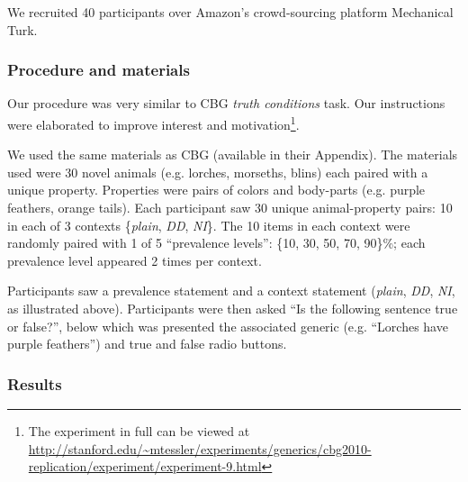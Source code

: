 \documentclass[10pt,letterpaper]{article}
\begin{document}
We recruited 40 participants over Amazon's crowd-sourcing platform Mechanical Turk.  

\subsubsection{Procedure and materials}

Our procedure was very similar to CBG \emph{truth conditions} task. Our instructions were elaborated to improve interest and motivation\footnote{The experiment in full can be viewed at \url{http://stanford.edu/~mtessler/experiments/generics/cbg2010-replication/experiment/experiment-9.html}}. 

We used the same materials as CBG (available in their Appendix). The materials used were 30 novel animals (e.g. lorches, morseths, blins) each paired with a unique property. Properties were pairs of colors and body-parts (e.g. purple feathers, orange tails). Each participant saw 30 unique animal-property pairs: 10 in each of 3 contexts \{\emph{plain}, \emph{DD}, \emph{NI}\}. The 10 items in each context were randomly paired with 1 of 5 ``prevalence levels'': \{10, 30, 50, 70, 90\}\%; each prevalence level appeared 2 times per context. 

Participants saw a prevalence statement and a context statement (\emph{plain}, \emph{DD}, \emph{NI}, as illustrated above). 
Participants were then asked ``Is the following sentence true or false?'', below which was presented the associated generic (e.g. ``Lorches have purple feathers'') and true and false radio buttons. 

\subsubsection{Results}
\end{document}
